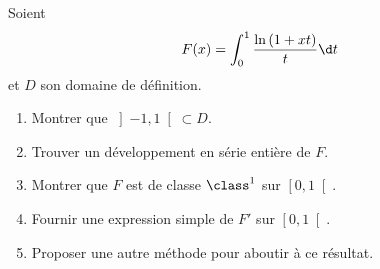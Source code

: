 \begin{enonce}
\begin{exercise}[ID={RMS132 E1174},subtitle={CCINP PSI 2021},tags={}, difficulty={0}]
Soient
\begin{equation*}
  F(x) = \int_0^1 \frac{\ln\left( 1+xt \right)}{t} \d t
\end{equation*}
et $D$ son domaine de définition.
\begin{enumerate}
  \item Montrer que $\left]-1,1\right[\subset D$.
  \item Trouver un développement en série entière de $F$.
  \item Montrer que $F$ est de classe $\class^1$ sur $\left[0,1\right[$.
  \item Fournir une expression simple de $F'$ sur $\left[0,1\right[$.
  \item Proposer une autre méthode pour aboutir à ce résultat.
\end{enumerate}
\end{exercise}
\begin{solution}
\end{solution}
\end{enonce}
